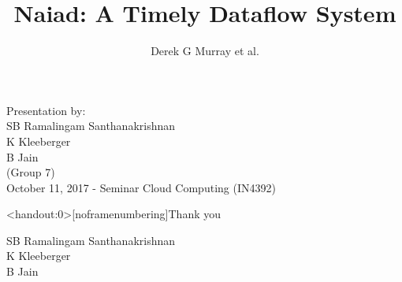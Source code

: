 \documentclass{beamer}
\title[]{Naiad: A Timely Dataflow System}
\author{Derek G Murray et al.}
\institute{$24^{th}$ ACM Symposium on Operating System Principles, 2013}
\date{}
\begin{document}
\begin{frame}[noframenumbering]
  \maketitle
  \vspace{2.25cm}
  \scriptsize{Presentation by:} \\
  \normalsize{
    SB Ramalingam Santhanakrishnan \\
    K Kleeberger \\
    B Jain \\
    (Group 7)\\
  }
  \vspace{0.6cm}
  \scriptsize{October 11, 2017 - Seminar Cloud Computing (IN4392)}

\end{frame}












\begin{frame}<handout:0>[noframenumbering]{Thank you}

  \Large{SB Ramalingam Santhanakrishnan}\\
  \vspace{1.25cm}
  \Large{K Kleeberger}\\
  \vspace{1.25cm}
  \Large{B Jain}

\end{frame}
\end{document}
